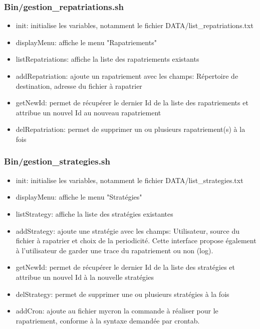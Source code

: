 \documentclass[a4paper,11pt]{article}
\begin{document}
		\subsubsection{Bin/gestion\_repatriations.sh}
			\begin{itemize}
				\item init: initialise les variables, notamment le fichier DATA/list\_repatriations.txt
				\item displayMenu: affiche le menu "Rapatriements"
				\item listRepatriations: affiche la liste des rapatriements existants
				\item addRepatriation: ajoute un rapatriement avec les champs: Répertoire de destination, adresse du fichier à rapatrier
				\item getNewId: permet de récupérer le dernier Id de la liste des rapatriements et attribue un nouvel Id au nouveau rapatriement
				\item delRepatriation: permet de supprimer un ou plusieurs rapatriement(s) à la fois
			\end{itemize}
	
		\subsubsection{Bin/gestion\_strategies.sh}
			\begin{itemize}
				\item init: initialise les variables, notamment le fichier DATA/list\_strategies.txt
				\item displayMenu: affiche le menu "Stratégies"
				\item listStrategy: affiche la liste des stratégies existantes
				\item addStrategy: ajoute une stratégie avec les champs: Utilisateur, source du fichier à rapatrier et choix de la periodicité. Cette interface propose également à l'utilisateur de garder une trace du rapatriement ou non (log). 
				\item getNewId: permet de récupérer le dernier Id de la liste des stratégies et attribue un nouvel Id à la nouvelle stratégies
				\item delStrategy: permet de supprimer une ou plusieurs stratégies à la fois
				\item addCron: ajoute au fichier mycron la commande à réaliser pour le rapatriement, conforme à la syntaxe demandée par crontab. 
			\end{itemize}
	
\end{document}
